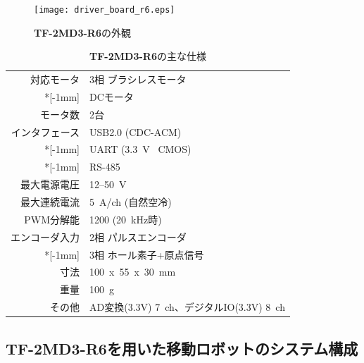\documentclass[11pt,a4j,openany,fleqn]{jbook}
\begin{document}
\begin{figure}[H]
\centering\texttt{[image: driver\_board\_r6.eps]}
\caption{{\bf TF-2MD3-R6}の外観}
\label{fig:driver_board_r6}
\end{figure}

\begin{table}[H]
\caption{{\bf TF-2MD3-R6}の主な仕様}
\label{tb:tfrog_motor_driver}
\smallskip
\centering\begin{tabular}{rl}
\toprule
対応モータ			&	3相 ブラシレスモータ			\\*[-1mm]
					&	DCモータ						\\
モータ数			&	2台								\\
インタフェース		&	USB2.0 (CDC-ACM)				\\*[-1mm]
					&	UART (3.3~V \ CMOS)				\\*[-1mm]
					&	RS-485							\\
最大電源電圧		&	12--50~V						\\
最大連続電流		&	5~A/ch (自然空冷)				\\
PWM分解能			&	1200 (20~kHz時)					\\
エンコーダ入力		&	2相 パルスエンコーダ			\\*[-1mm]
					&	3相 ホール素子+原点信号			\\
寸法				&	100~x~55~x~30~mm				\\
重量				&	100~g							\\
その他				&	AD変換(3.3V) 7~ch、デジタルIO(3.3V) 8~ch	\\
\bottomrule
\end{tabular}
\end{table}


\newpage
\subsection{{\bf TF-2MD3-R6}を用いた移動ロボットのシステム構成}
\label{sec:システム構成}
\end{document}
